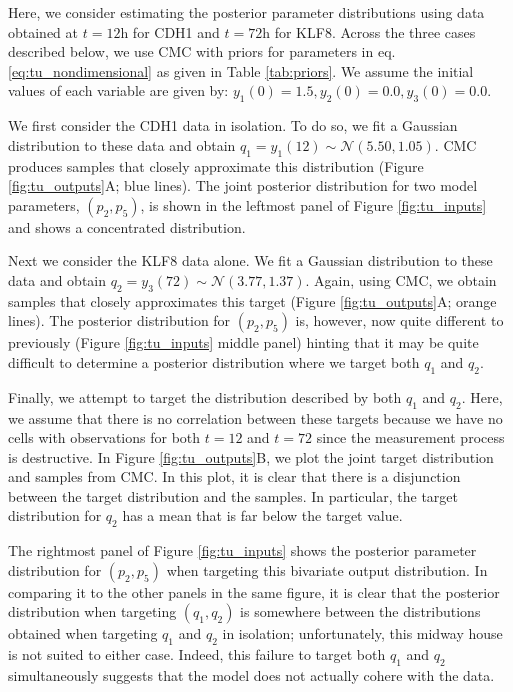 Here, we consider estimating the posterior parameter distributions using data obtained at $t=12 \text{h}$ for CDH1 and $t=72 \text{h}$ for KLF8. Across the three cases described below, we use CMC with priors for parameters in eq. \eqref{eq:tu_nondimensional} as given in Table \ref{tab:priors}. We assume the initial values of each variable are given by: $y_1(0) = 1.5, y_2(0) = 0.0, y_3(0) = 0.0$.

We first consider the CDH1 data in isolation. To do so, we fit a Gaussian distribution to these data and obtain $q_1=y_1(12)  \sim \mathcal{N}(5.50, 1.05)$. CMC produces samples that closely approximate this distribution (Figure \ref{fig:tu_outputs}A; blue lines). The joint posterior distribution for two model parameters, $(p_2, p_5)$, is shown in the leftmost panel of Figure \ref{fig:tu_inputs} and shows a concentrated distribution.

Next we consider the KLF8 data alone. We fit a Gaussian distribution to these data and obtain $q_2=y_3(72)  \sim \mathcal{N}(3.77, 1.37)$.  Again, using CMC, we obtain samples that closely approximates this target (Figure \ref{fig:tu_outputs}A; orange lines). The posterior distribution for $(p_2, p_5)$ is, however, now quite different to previously (Figure \ref{fig:tu_inputs} middle panel) hinting that it may be quite difficult to determine a posterior distribution where we target both $q_1$ and $q_2$.

Finally, we attempt to target the distribution described by both $q_1$ and $q_2$. Here, we assume that there is no correlation between these targets because we have no cells with observations for both $t=12$ and $t=72$ since the measurement process is destructive. In Figure \ref{fig:tu_outputs}B, we plot the joint target distribution and samples from CMC. In this plot, it is clear that there is a disjunction between the target distribution and the samples. In particular, the target distribution for $q_2$ has a mean that is far below the target value.

The rightmost panel of Figure \ref{fig:tu_inputs} shows the posterior parameter distribution for $(p_2, p_5)$ when targeting this bivariate output distribution. In comparing it to the other panels in the same figure, it is clear that the posterior distribution when targeting $(q_1,q_2)$ is somewhere between the distributions obtained when targeting $q_1$ and $q_2$ in isolation; unfortunately, this midway house is not suited to either case. Indeed, this failure to target both $q_1$ and $q_2$ simultaneously suggests that the model does not actually cohere with the data.

